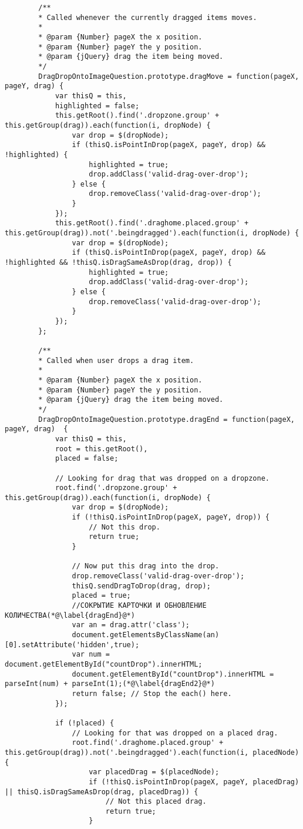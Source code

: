 \begin{lstlisting}
		/**
		* Called whenever the currently dragged items moves.
		*
		* @param {Number} pageX the x position.
		* @param {Number} pageY the y position.
		* @param {jQuery} drag the item being moved.
		*/
		DragDropOntoImageQuestion.prototype.dragMove = function(pageX, pageY, drag) {
			var thisQ = this,
			highlighted = false;
			this.getRoot().find('.dropzone.group' + this.getGroup(drag)).each(function(i, dropNode) {
				var drop = $(dropNode);
				if (thisQ.isPointInDrop(pageX, pageY, drop) && !highlighted) {
					highlighted = true;
					drop.addClass('valid-drag-over-drop');
				} else {
					drop.removeClass('valid-drag-over-drop');
				}
			});
			this.getRoot().find('.draghome.placed.group' + this.getGroup(drag)).not('.beingdragged').each(function(i, dropNode) {
				var drop = $(dropNode);
				if (thisQ.isPointInDrop(pageX, pageY, drop) && !highlighted && !thisQ.isDragSameAsDrop(drag, drop)) {
					highlighted = true;
					drop.addClass('valid-drag-over-drop');
				} else {
					drop.removeClass('valid-drag-over-drop');
				}
			});
		};
		
		/**
		* Called when user drops a drag item.
		*
		* @param {Number} pageX the x position.
		* @param {Number} pageY the y position.
		* @param {jQuery} drag the item being moved.
		*/
		DragDropOntoImageQuestion.prototype.dragEnd = function(pageX, pageY, drag)  {
			var thisQ = this,
			root = this.getRoot(),
			placed = false;
			
			// Looking for drag that was dropped on a dropzone.
			root.find('.dropzone.group' + this.getGroup(drag)).each(function(i, dropNode) {
				var drop = $(dropNode);
				if (!thisQ.isPointInDrop(pageX, pageY, drop)) {
					// Not this drop.
					return true;
				}
				
				// Now put this drag into the drop.
				drop.removeClass('valid-drag-over-drop');
				thisQ.sendDragToDrop(drag, drop);
				placed = true;
				//СОКРЫТИЕ КАРТОЧКИ И ОБНОВЛЕНИЕ КОЛИЧЕСТВА(*@\label{dragEnd}@*)
				var an = drag.attr('class');
				document.getElementsByClassName(an)[0].setAttribute('hidden',true);
				var num = document.getElementById("countDrop").innerHTML;
				document.getElementById("countDrop").innerHTML =  parseInt(num) + parseInt(1);(*@\label{dragEnd2}@*)
				return false; // Stop the each() here.
			});
			
			if (!placed) {
				// Looking for that was dropped on a placed drag.
				root.find('.draghome.placed.group' + this.getGroup(drag)).not('.beingdragged').each(function(i, placedNode) {
					var placedDrag = $(placedNode);
					if (!thisQ.isPointInDrop(pageX, pageY, placedDrag) || thisQ.isDragSameAsDrop(drag, placedDrag)) {
						// Not this placed drag.
						return true;
					}
					

\end{lstlisting}
